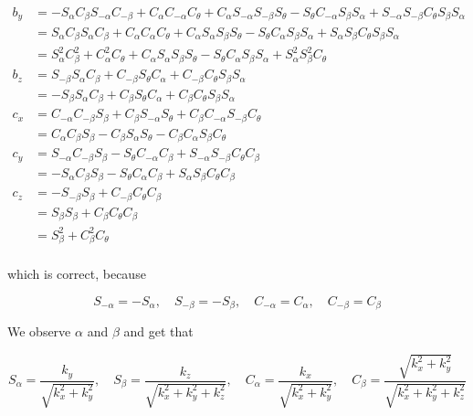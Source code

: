 \documentclass[a4paper,11pt]{article}
\begin{document}
\begin {enumerate}
\begin{align*}
			b_y &= -S_{\alpha}C_{\beta}S_{-\alpha}C_{-\beta} + C_{\alpha}C_{-\alpha}C_{\theta} + C_{\alpha}S_{-\alpha}S_{-\beta}S_{\theta} - S_{\theta}C_{-\alpha}S_{\beta}S_{\alpha} + S_{-\alpha}S_{-\beta}C_{\theta}S_{\beta}S_{\alpha}\\
			&= S_{\alpha}C_{\beta}S_{\alpha}C_{\beta} + C_{\alpha}C_{\alpha}C_{\theta} + C_{\alpha}S_{\alpha}S_{\beta}S_{\theta} - S_{\theta}C_{\alpha}S_{\beta}S_{\alpha} + S_{\alpha}S_{\beta}C_{\theta}S_{\beta}S_{\alpha}\\
			&= S_{\alpha}^2C_{\beta}^2 + C_{\alpha}^2C_{\theta} + C_{\alpha}S_{\alpha}S_{\beta}S_{\theta} - S_{\theta}C_{\alpha}S_{\beta}S_{\alpha} + S_{\alpha}^2S_{\beta}^2C_{\theta}\\
			b_z &= S_{-\beta}S_{\alpha}C_{\beta} + C_{-\beta}S_{\theta}C_{\alpha} + C_{-\beta}C_{\theta}S_{\beta}S_{\alpha}\\
			&= -S_{\beta}S_{\alpha}C_{\beta} + C_{\beta}S_{\theta}C_{\alpha} + C_{\beta}C_{\theta}S_{\beta}S_{\alpha}\\
			c_x &= C_{-\alpha}C_{-\beta}S_{\beta} + C_{\beta}S_{-\alpha}S_{\theta} + C_{\beta}C_{-\alpha}S_{-\beta}C_{\theta}\\
			&= C_{\alpha}C_{\beta}S_{\beta} - C_{\beta}S_{\alpha}S_{\theta} - C_{\beta}C_{\alpha}S_{\beta}C_{\theta}\\
			c_y &= S_{-\alpha}C_{-\beta}S_{\beta} - S_{\theta}C_{-\alpha}C_{\beta} + S_{-\alpha}S_{-\beta}C_{\theta}C_{\beta}\\
			&= -S_{\alpha}C_{\beta}S_{\beta} - S_{\theta}C_{\alpha}C_{\beta} + S_{\alpha}S_{\beta}C_{\theta}C_{\beta}\\
			c_z &= -S_{-\beta}S_{\beta} + C_{-\beta}C_{\theta}C_{\beta}\\
			&= S_{\beta}S_{\beta} + C_{\beta}C_{\theta}C_{\beta}\\
			&= S_{\beta}^2 + C_{\beta}^2C_{\theta}\\
		\end{align*}

		which is correct, because

		$$S_{-\alpha} = -S_{\alpha}, \quad S_{-\beta} = -S_{\beta}, \quad C_{-\alpha} = C_{\alpha}, \quad C_{-\beta} = C_{\beta}$$

		We observe $\alpha$ and $\beta$ and get that

		$$S_{\alpha} = \frac{k_y}{\sqrt{k_x^2 + k_y^2}}, \quad S_{\beta} = \frac{k_z}{\sqrt{k_x^2+k_y^2+k_z^2}}, \quad C_{\alpha} = \frac{k_x}{\sqrt{k_x^2 + k_y^2}}, \quad C_{\beta} = \frac{\sqrt{k_x^2 + k_y^2}}{\sqrt{k_x^2+k_y^2+k_z^2}}$$


\end{enumerate}
\end{document}
